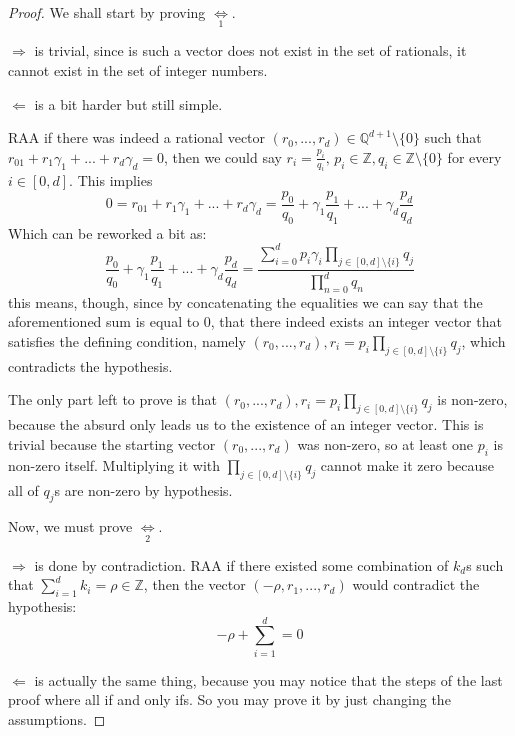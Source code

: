 \begin{proof}
    We shall start by proving $\underset{1}{\iff}$. 
    
    $\Rightarrow$ is trivial, since is such a vector does not exist in the set of rationals, it cannot exist in the set of integer numbers.

    $\Leftarrow$ is a bit harder but still simple. 
    
    RAA if there was indeed a rational vector $(r_0,...,r_d)\in\mathbb{Q}^{d+1}\setminus \{0\}$ such that $r_01+r_1\gamma_1+...+r_d\gamma_d=0$, then we could say $r_i=\frac{p_i}{q_i},\, p_i \in \mathbb{Z}, q_i\in\mathbb{Z}\setminus\{0\}$ for every $i \in [0, d]$. This implies \begin{equation*}
        0=r_01+r_1\gamma_1+...+r_d\gamma_d=\frac{p_0}{q_0}+\gamma_1\frac{p_1}{q_1}+...+\gamma_d\frac{p_d}{q_d}
    \end{equation*}
    Which can be reworked a bit as: \begin{equation*}
        \frac{p_0}{q_0}+\gamma_1\frac{p_1}{q_1}+...+\gamma_d\frac{p_d}{q_d}=\frac{\sum_{i=0}^{d}p_i\gamma_i\prod_{j\in[0, d]\setminus\{i\}}q_j}{\prod_{n=0}^{d}q_n}
    \end{equation*}
    this means, though, since by concatenating the equalities we can say that the aforementioned sum is equal to 0, that there indeed exists an integer vector that satisfies the defining condition, namely $(r_0,...,r_d), r_i=p_i\prod_{j\in[0, d]\setminus\{i\}}q_j$, which contradicts the hypothesis.
    
    The only part left to prove is that $(r_0,...,r_d), r_i=p_i\prod_{j\in[0, d]\setminus\{i\}}q_j$ is non-zero, because the absurd only leads us to the existence of an integer vector. This is trivial because the starting vector $(r_0,...,r_d)$ was non-zero, so at least one $p_i$ is non-zero itself. Multiplying it with $\prod_{j\in[0, d]\setminus\{i\}}q_j$ cannot make it zero because all of $q_j$s are non-zero by hypothesis.

    Now, we must prove $\underset{2}{\iff}$.

    $\Rightarrow$ is done by contradiction. RAA if there existed some combination of $k_d$s such that $\sum_{i=1}^{d}k_i=\rho\in\mathbb{Z}$, then the vector $(-\rho, r_1, ..., r_d)$ would contradict the hypothesis:
    \begin{equation*}
        -\rho+\sum_{i=1}^{d}=0
    \end{equation*}

    $\Leftarrow$ is actually the same thing, because you may notice that the steps of the last proof where all if and only ifs. So you may prove it by just changing the assumptions.
\end{proof}

